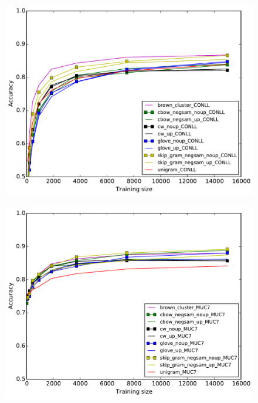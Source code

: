 \begin{figure}
\begin{minipage}[b]{7cm}
    \label{POS-OOV-OUT}	
  \end{minipage} 
  \begin{minipage}[b]{7cm}
    	\includegraphics[scale=0.4]{plots/NER-OOV-IN}
    \label{NER-OOV-IN}
  \end{minipage}
  \hfill
  \begin{minipage}[b]{7cm}
    	\includegraphics[scale=0.4]{plots/NER-OOV-OUT}
    \label{NER-OOV-OUT}
  \end{minipage} 
  \begin{minipage}[b]{7cm}

\end{minipage}
\end{figure}
